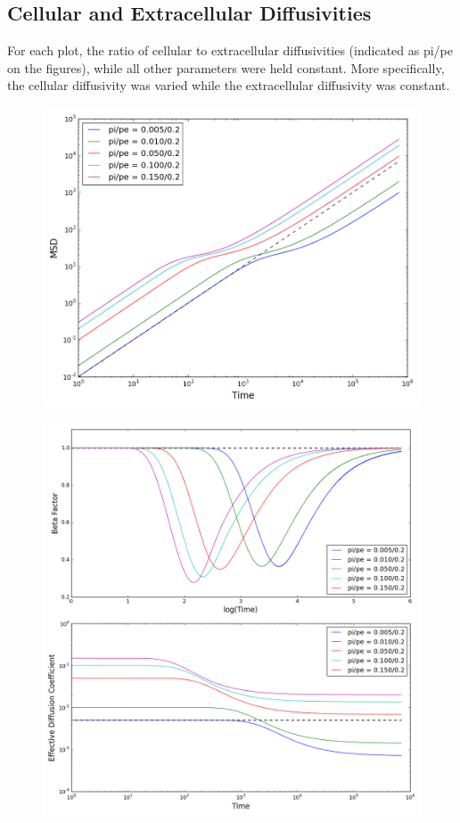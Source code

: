 \newpage
\subsection{Cellular and Extracellular Diffusivities}
\label{sec:1D-cellular-extracellular-diffusivities}
	For each plot, the ratio of cellular to extracellular diffusivities (indicated as pi/pe on the figures), while all other parameters were held constant. More specifically, the cellular diffusivity was varied while the extracellular diffusivity was constant.
	
	\begin{figure}[h]
		\centering
		\includegraphics[width=1.0\linewidth]{../images/1D/pipe_msd_1D}
		\caption{}
		\label{fig:pipe_msd_1D}
	\end{figure}
	
	\begin{figure}[h]
		\centering
		\includegraphics[width=1.0\linewidth]{../images/1D/pipe_beta_deff_1D}
		\caption{}
		\label{fig:pipe_beta_deff_1D}
	\end{figure}

